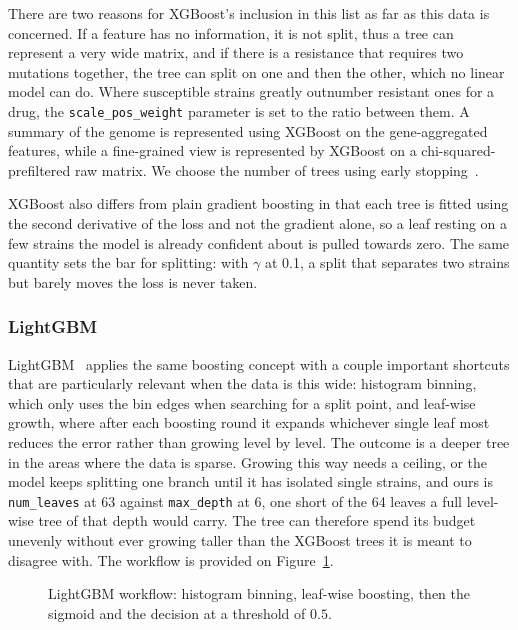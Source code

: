 \vspace{1em}

There are two reasons for XGBoost's inclusion in this list as far as this data is concerned.
If a feature has no information, it is not split, thus a tree can represent a very wide
matrix, and if there is a resistance that requires two mutations together, the tree can split
on one and then the other, which no linear model can do. Where susceptible strains greatly outnumber resistant ones for a drug, the
\texttt{scale\_pos\_weight} parameter is set to the ratio between them. A summary of the genome is represented using XGBoost on the gene-aggregated features, while a
fine-grained view is represented by XGBoost on a chi-squared-prefiltered raw matrix. We choose the number of trees using early stopping~\cite{prechelt1998earlystopping}.

XGBoost also differs from plain gradient boosting in that each tree is fitted using the second
derivative of the loss and not the gradient alone, so a leaf resting on a few strains the model
is already confident about is pulled towards zero. The same quantity sets the bar for splitting:
with $\gamma$ at 0.1, a split that separates two strains but barely moves the loss is never taken.

\subsubsection{LightGBM}

LightGBM~\cite{ke2017lightgbm} applies the same boosting concept with a couple important
shortcuts that are particularly relevant when the data is this wide: histogram binning, which
only uses the bin edges when searching for a split point, and leaf-wise growth, where after
each boosting round it expands whichever single leaf most reduces the error rather than growing
level by level. The outcome is a deeper tree in the areas where the data is
sparse. Growing this way needs a ceiling, or the model keeps splitting one branch until it has
isolated single strains, and ours is \texttt{num\_leaves} at 63 against \texttt{max\_depth} at
6, one short of the 64 leaves a full level-wise tree of that depth would carry. The tree can
therefore spend its budget unevenly without ever growing taller than the XGBoost trees it is
meant to disagree with. The workflow is provided on Figure~\ref{fig:lightgbm-workflow}.

\begin{figure}[H]
    \centering
    \resizebox{0.94\textwidth}{!}{}
    \caption{LightGBM workflow: histogram binning, leaf-wise boosting, then the sigmoid
    and the decision at a threshold of $0.5$.}
    \label{fig:lightgbm-workflow}
\end{figure}

